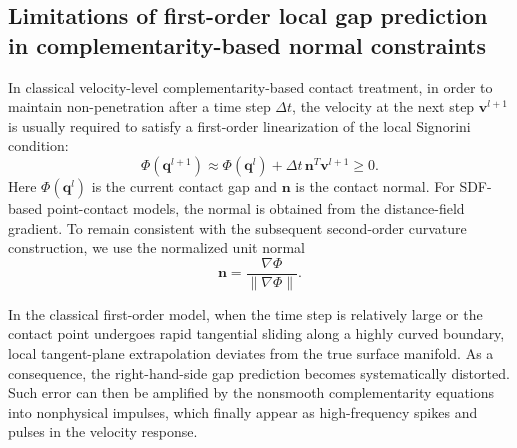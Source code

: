 \subsection{Limitations of first-order local gap prediction in complementarity-based normal constraints}
In classical velocity-level complementarity-based contact treatment, in order to maintain non-penetration after a time step $\Delta t$, the velocity at the next step $\mathbf{v}^{l+1}$ is usually required to satisfy a first-order linearization of the local Signorini condition:
\begin{equation}
    \Phi(\mathbf{q}^{l+1}) \approx \Phi(\mathbf{q}^l) + \Delta t \, \mathbf{n}^T \mathbf{v}^{l+1} \geq 0.
\end{equation}
Here $\Phi(\mathbf{q}^l)$ is the current contact gap and $\mathbf{n}$ is the contact normal. For SDF-based point-contact models, the normal is obtained from the distance-field gradient. To remain consistent with the subsequent second-order curvature construction, we use the normalized unit normal
\begin{equation}
    \mathbf{n} = \frac{\nabla \Phi}{\|\nabla \Phi\|}.
\end{equation}

In the classical first-order model, when the time step is relatively large or the contact point undergoes rapid tangential sliding along a highly curved boundary, local tangent-plane extrapolation deviates from the true surface manifold. As a consequence, the right-hand-side gap prediction becomes systematically distorted. Such error can then be amplified by the nonsmooth complementarity equations into nonphysical impulses, which finally appear as high-frequency spikes and pulses in the velocity response.

